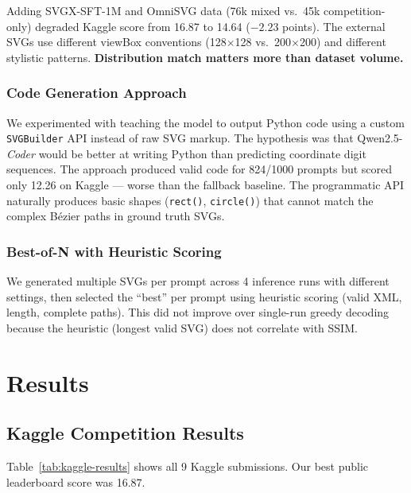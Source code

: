 \documentclass[11pt]{article}
\begin{document}
Adding SVGX-SFT-1M and OmniSVG data (76k mixed vs.\ 45k competition-only) degraded Kaggle score from 16.87 to 14.64 ($-2.23$ points). The external SVGs use different viewBox conventions (128$\times$128 vs.\ 200$\times$200) and different stylistic patterns. \textbf{Distribution match matters more than dataset volume.}

\subsubsection{Code Generation Approach}

We experimented with teaching the model to output Python code using a custom \texttt{SVGBuilder} API instead of raw SVG markup. The hypothesis was that Qwen2.5-\textit{Coder} would be better at writing Python than predicting coordinate digit sequences. The approach produced valid code for 824/1000 prompts but scored only 12.26 on Kaggle --- worse than the fallback baseline. The programmatic API naturally produces basic shapes (\texttt{rect()}, \texttt{circle()}) that cannot match the complex B\'{e}zier paths in ground truth SVGs.

\subsubsection{Best-of-N with Heuristic Scoring}

We generated multiple SVGs per prompt across 4 inference runs with different settings, then selected the ``best'' per prompt using heuristic scoring (valid XML, length, complete paths). This did not improve over single-run greedy decoding because the heuristic (longest valid SVG) does not correlate with SSIM.

\section{Results}

\subsection{Kaggle Competition Results}

Table~\ref{tab:kaggle-results} shows all 9 Kaggle submissions. Our best public leaderboard score was 16.87.
\end{document}
